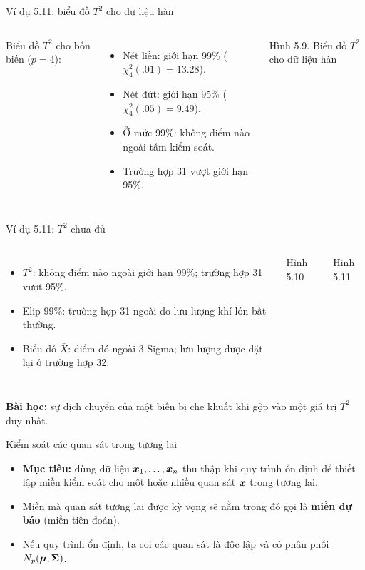 \begin{frame}{Ví dụ 5.11: biểu đồ \(T^2\) cho dữ liệu hàn}
  \begin{columns}[T]
    \small
    Biểu đồ \(T^2\) cho bốn biến (\(p=4\)):
    \begin{itemize}
      \item Nét liền: giới hạn 99\% (\(\chi^2_4(.01)=13.28\)).
      \item Nét đứt: giới hạn 95\% (\(\chi^2_4(.05)=9.49\)).
      \item Ở mức 99\%: không điểm nào ngoài tầm kiểm soát.
      \item Trường hợp 31 vượt giới hạn 95\%.
    \end{itemize}
    \centering
    \resizebox{\linewidth}{!}{}

    {\scriptsize Hình 5.9. Biểu đồ \(T^2\) cho dữ liệu hàn}
  \end{columns}
\end{frame}

\begin{frame}{Ví dụ 5.11: \(T^2\) chưa đủ}
  \begin{columns}[T]
    \small
    \begin{itemize}
      \item \(T^2\): không điểm nào ngoài giới hạn 99\%; trường hợp 31 vượt 95\%.
      \item Elip 99\%: trường hợp 31 ngoài do lưu lượng khí lớn bất thường.
      \item Biểu đồ \(\bar{X}\): điểm đó ngoài 3 Sigma; lưu lượng được đặt lại ở trường hợp 32.
    \end{itemize}
    \centering
    \resizebox{\linewidth}{!}{}

    {\scriptsize Hình 5.10}
    \centering
    \resizebox{\linewidth}{!}{}

    {\scriptsize Hình 5.11}
  \end{columns}
  \small \textbf{Bài học:} sự dịch chuyển của một biến bị che khuất khi gộp vào một giá trị \(T^2\) duy nhất.
\end{frame}

\begin{frame}{Kiểm soát các quan sát trong tương lai}
  \begin{itemize}
    \item \textbf{Mục tiêu:} dùng dữ liệu \(\boldsymbol{x}_1,\dots,\boldsymbol{x}_n\) thu thập khi quy trình ổn định để thiết lập miền kiểm soát cho một hoặc nhiều quan sát \(\boldsymbol{x}\) trong tương lai.
    \item Miền mà quan sát tương lai được kỳ vọng sẽ nằm trong đó gọi là \textbf{miền dự báo} (miền tiên đoán).
    \item Nếu quy trình ổn định, ta coi các quan sát là độc lập và có phân phối \(N_p(\boldsymbol{\mu},\boldsymbol{\Sigma})\).
  \end{itemize}
\end{frame}

